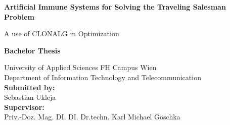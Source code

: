 \begin{center}

\vspace{1.3cm}

\hspace*{-1.0cm} {\Large \textbf{Artificial Immune Systems for Solving the Traveling Salesman Problem\\}}

\hspace*{-1.0cm} A use of CLONALG in Optimization \\

\vspace{2.2cm}

\hspace*{-1.0cm} \textbf{Bachelor Thesis\\}

\vspace{0.65cm}

\hspace*{-1.0cm}University of Applied Sciences FH Campus Wien \\
\hspace*{-1.0cm}Department of Information Technology and Telecommunication\\
\vspace{3cm}
\hspace*{-1.0cm} \textbf{Submitted by:} \\
\hspace*{-1.0cm} Sebastian Ukleja \\





\vspace{5cm}
\hspace*{-1.0cm} \textbf{Supervisor:} \\
\hspace*{-1.0cm} Priv.-Doz. Mag. DI. DI. Dr.techn. Karl Michael Göschka \\


\end{center}
